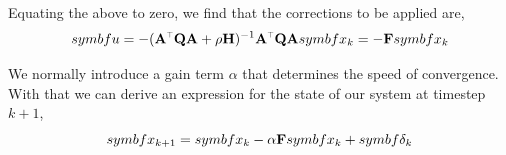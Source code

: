 \documentclass[SE,authoryear,toc]{lsstdoc}
\renewcommand{\v}[1]{\mathbf{#1}}
\newcommand{\tr}{\scalebox{0.6}{$\top$}}
\begin{document}
Equating the above to zero, we find that the corrections to be applied are, 
\begin{equation}
    \\symbf{u} = -(\v{A}^{\tr}\v{Q}\v{A} + \rho \v{H})^{-1}\v{A}^{\tr}\v{Q}\v{A}\\symbf{x}_k = -\v{F}\\symbf{x}_k
\end{equation}

We normally introduce a gain term $\alpha$ that determines the speed of convergence. With that we can derive an expression for the state of our system at timestep $k+1$,
\begin{equation}\label{eq4}
    \\symbf{x}_{k + 1} = \\symbf{x}_{k} - \alpha\v{F}\\symbf{x}_k + \\symbf{\delta}_{k}
\end{equation}
\end{document}
